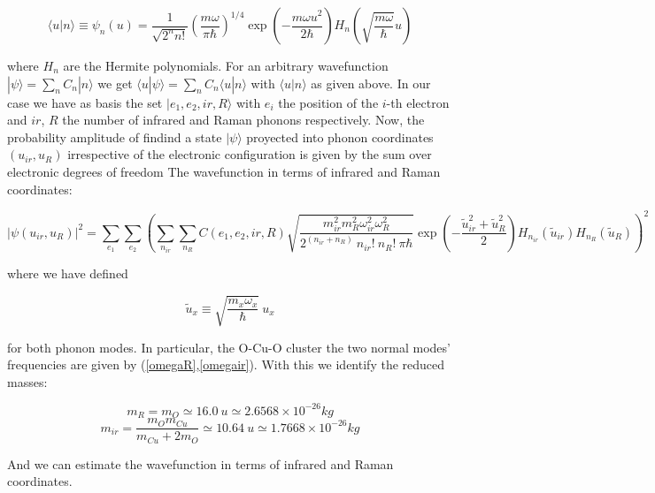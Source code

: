 \begin{equation}\label{harmOscProj} \langle u | n \rangle \equiv \psi_n(u) = \frac{1}{\sqrt{2^n n!}} \left(\frac{m \omega}{\pi \hbar}\right)^{1/4}\exp\left(-\frac{m \omega u^2}{2 \hbar}\right) H_n\left( \sqrt{\frac{m \omega}{\hbar}} u \right) \end{equation}

where $H_n$ are the Hermite polynomials. For an arbitrary wavefunction $ | \psi \rangle = \sum_n C_n |n \rangle$ we get $ \langle u | \psi \rangle = \sum_n C_n \langle u | n \rangle$ with $\langle u | n \rangle$ as given above. In our case we have as basis the set ${| e_1, e_2, ir, R \rangle}$ with $e_i$ the position of the $i$-th electron and $ir$, $R$ the number of infrared and Raman phonons respectively. Now, the probability amplitude of findind a state $|\psi\rangle$ proyected into phonon coordinates $(u_{ir},u_R)$ irrespective of the electronic configuration is given by the sum over electronic degrees of freedom The wavefunction in terms of infrared and Raman coordinates:

\begin{equation}\label{phonon-coord-projection} |\psi(u_{ir}, u_R)|^2 = \sum_{e_1}\sum_{e_2} \left(\sum_{n_{ir}} \sum_{n_R} C(e_1, e_2, ir, R) \sqrt{\frac{ m_{ir}^2 m_R^2 \omega_{ir}^2 \omega_R^2 }{2^{(n_{ir} + n_R)}\ n_{ir}!\ n_R!\ \pi \hbar}} \exp \left( - \frac{ \tilde{u}_{ir}^2 + \tilde{u}_R^2 }{2}\right) H_{n_{ir}} ( \tilde{u}_{ir}) H_{n_R}( \tilde{u}_R) \right)^2
\end{equation}

where we have defined 

\begin{equation}\label{uTildeDef}\tilde{u}_x \equiv \sqrt{\frac{m_x\omega_x}{\hbar}}\ u_x\end{equation}

for both phonon modes. In particular, the O-Cu-O cluster the two normal modes' frequencies are given by (\ref{omegaR},\ref{omegair}). With this we identify the reduced masses:

\begin{equation}\label{redMassR} m_R = m_O \simeq 16.0\ u \simeq 2.6568 \times 10^{-26} kg\end{equation}
\begin{equation}\label{redMassIr}m_{ir}=\frac{m_Om_{Cu}}{m_{Cu}+2m_O} \simeq 10.64\ u \simeq 1.7668 \times 10^{-26}kg\end{equation}

And we can estimate the wavefunction in terms of infrared and Raman coordinates.

